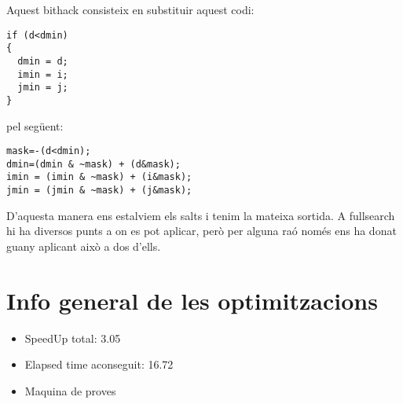 Aquest bithack consisteix en substituir aquest codi:

\begin{lstlisting}
if (d<dmin)
{
  dmin = d;
  imin = i;
  jmin = j;
}
\end{lstlisting}

pel següent:

\begin{lstlisting}
mask=-(d<dmin);
dmin=(dmin & ~mask) + (d&mask);
imin = (imin & ~mask) + (i&mask);
jmin = (jmin & ~mask) + (j&mask);
\end{lstlisting}

D'aquesta manera ens estalviem els salts i tenim la mateixa sortida. A fullsearch hi ha diversos punts a on es pot aplicar, però per alguna raó només ens ha donat guany aplicant això a dos d'ells.


\section{Info general de les optimitzacions}
\begin{itemize}
\item{SpeedUp total: 3.05}
\item{Elapsed time aconseguit: 16.72}
\item{Maquina de proves}
\end{itemize}
